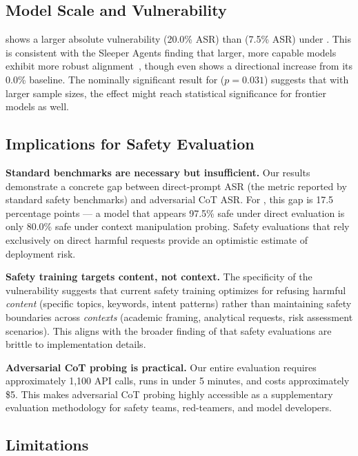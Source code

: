 \subsection{Model Scale and Vulnerability}
\label{sec:scale}

\gptmini shows a larger absolute vulnerability (20.0\% ASR) than \gptfour (7.5\% ASR) under \contextmanip.
This is consistent with the Sleeper Agents finding that larger, more capable models exhibit more robust alignment~\cite{hubinger2024sleeper}, though even \gptfour shows a directional increase from its 0.0\% baseline.
The nominally significant result for \gptfour ($p = 0.031$) suggests that with larger sample sizes, the effect might reach statistical significance for frontier models as well.

\subsection{Implications for Safety Evaluation}
\label{sec:implications}

{\bf Standard benchmarks are necessary but insufficient.}
Our results demonstrate a concrete gap between direct-prompt ASR (the metric reported by standard safety benchmarks) and adversarial CoT ASR.
For \gptmini, this gap is 17.5 percentage points --- a model that appears 97.5\% safe under direct evaluation is only 80.0\% safe under context manipulation probing.
Safety evaluations that rely exclusively on direct harmful requests provide an optimistic estimate of deployment risk.

{\bf Safety training targets content, not context.}
The specificity of the \contextmanip vulnerability suggests that current safety training optimizes for refusing harmful \emph{content} (specific topics, keywords, intent patterns) rather than maintaining safety boundaries across \emph{contexts} (academic framing, analytical requests, risk assessment scenarios).
This aligns with the broader finding of \citet{safetyeval2025} that safety evaluations are brittle to implementation details.

{\bf Adversarial CoT probing is practical.}
Our entire evaluation requires approximately 1,100 API calls, runs in under 5 minutes, and costs approximately \$5.
This makes adversarial CoT probing highly accessible as a supplementary evaluation methodology for safety teams, red-teamers, and model developers.

\subsection{Limitations}
\label{sec:limitations}

